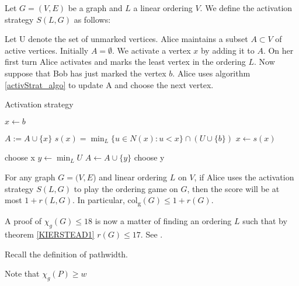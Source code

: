 \begin{definition} 
    Let $G=(V, E)$ be a graph and $L$ a linear ordering $V$. We define the activation strategy $S(L,G)$ as follows:
    
    Let U denote the set of unmarked vertices. Alice maintains a subset $A \subset V$ of active vertices. Initially $A = \emptyset$. We activate a vertex $x$ by adding it to $A$. On her first turn Alice activates and marks the least vertex in the ordering $L$. Now suppose that Bob has just marked the vertex $b$. Alice uses algorithm \ref{activStrat_algo} to update A and choose the
    next vertex.
    \begin{algorithm}[h]
        \caption{Activation strategy}
        \label{activStrat_algo}
        \begin{algorithmic}[1]
            \Statex
            \State $x \gets b$ 
            
                \State $A := A \cup \{x\}$
                \State $s(x) =\min_L\{u \in N(x) : u < x\} \cap (U \cup \{b\} )$
                \State $x \gets s(x)$
            \EndWhile      
            
                \State choose x
            \Else
                \State $y \gets \min_L U$
                    \State $A \gets A \cup \{y\}$                    
                \EndIf     
                \State choose y
            \EndIf   
        \end{algorithmic}
    \end{algorithm}
    
\end{definition}


\begin{theorem} \label{KIERSTEAD1}
    For any graph $G=(V, E$) and linear ordering $L$ on $V$, if Alice uses the activation strategy $S(L, G)$ to play the ordering game on $G$, then the score will be at most $1+r(L, G)$. In particular, col\textsubscript{g}$(G) \leq 1+r(G)$.
\end{theorem}

A proof of $\chi_g(G) \leq 18$ is now a matter of finding an ordering $L$ such that by theorem \ref{KIERSTEAD1} $r(G) \leq 17$. See \cite{KIERSTEAD2000}.

Recall the definition of pathwidth.

Note that $\chi_g(P) \geq w$

